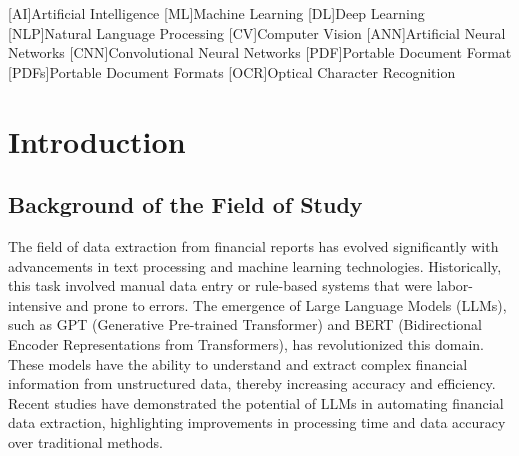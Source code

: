 \documentclass[english, 12pt, a4paper, elec, utf8, a-2b, online]{aaltothesis}
\begin{document}
\cleardoublepage

[AI]{Artificial Intelligence}
[ML]{Machine Learning}
[DL]{Deep Learning}
[NLP]{Natural Language Processing}
[CV]{Computer Vision}
[ANN]{Artificial Neural Networks}
[CNN]{Convolutional Neural Networks}
[PDF]{Portable Document Format}
[PDFs]{Portable Document Formats}
[OCR]{Optical Character Recognition}

\begin{acronym}
\end{acronym}

\section{Introduction}
\label{sec:intro}

\thispagestyle{empty}

\subsection{Background of the Field of Study}

The field of data extraction from financial reports has evolved significantly with advancements in text processing and machine learning technologies. Historically, this task involved manual data entry or rule-based systems that were labor-intensive and prone to errors. The emergence of Large Language Models (LLMs), such as GPT (Generative Pre-trained Transformer) and BERT (Bidirectional Encoder Representations from Transformers), has revolutionized this domain. These models have the ability to understand and extract complex financial information from unstructured data, thereby increasing accuracy and efficiency. Recent studies have demonstrated the potential of LLMs in automating financial data extraction, highlighting improvements in processing time and data accuracy over traditional methods.
\end{document}
